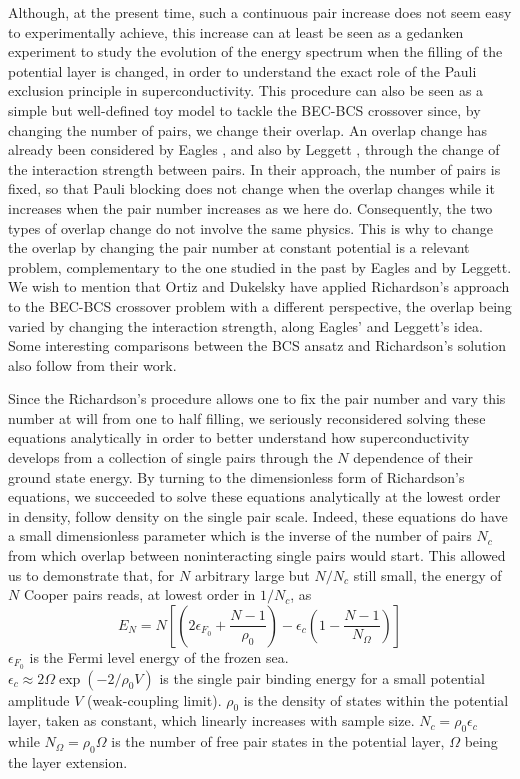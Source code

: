 \documentclass[epj]{svjour}
\begin{document}
Although, at the present time, such a continuous pair increase
does not seem easy to experimentally achieve, this increase can at least be seen as a 
gedanken experiment to study the evolution of the energy spectrum when
the filling of the potential layer is changed, in order to understand the exact role of the Pauli
exclusion principle in superconductivity. 
This procedure can also be
seen as a simple but well-defined toy model to tackle the BEC-BCS crossover
since, by changing the number of pairs, we change their overlap. 
An overlap change has already been considered by Eagles \cite{Eagle}, 
and also by Leggett \cite{LeggettCrossover}, through the change of the interaction strength between pairs. In their approach, the number of pairs is fixed, so that Pauli blocking does not change when the overlap changes while it increases when the pair number increases as we here do. Consequently, the two types of overlap change do not involve the same physics. This is why to change the overlap by changing the pair number at constant potential is a relevant problem, complementary to the one studied in the past by Eagles and by Leggett. We wish to mention that Ortiz and Dukelsky have applied Richardson's approach to the BEC-BCS crossover problem with a different perspective, the overlap being varied by changing the interaction strength\cite{crossoverRich}, along Eagles' and  Leggett's idea.  Some interesting comparisons between the BCS ansatz and Richardson's solution also follow from their work.  


Since the Richardson's procedure allows one to fix the pair number and vary 
this number at will from one to half filling, we seriously reconsidered 
solving these equations analytically in order to better understand how superconductivity develops from a collection of single pairs through the $N$ dependence of their ground state energy. By turning to the dimensionless form of Richardson's equations, we succeeded to solve these equations analytically at the lowest order in density, follow density on the single pair scale\cite{moth}. 
Indeed, these equations do have a small dimensionless parameter which is the inverse of the number of pairs $N_{c}$ from which overlap between noninteracting single pairs would start. 
This allowed us to demonstrate that, for $N$ arbitrary large but $N/N_{c}$ still small, 
the energy of $N$ Cooper pairs reads, at lowest order in $1/ N_{c}$, as
\begin{equation}
E_{N}= N\left[ \left( 2\epsilon _{F_{0}}+\frac{N-1}{\rho _{0}}%
\right)-\epsilon _{c}\left( 1-\frac{N-1}{N_{\Omega }}\right) \right]
\label{eq:eN}
\end{equation}%
$\epsilon _{F_{0}}$ is the Fermi level energy of the frozen sea.  \\$\epsilon _{c}\approx
2\Omega \exp \left( -2/\rho _{0}V\right) $ is the single pair binding
energy for a small potential amplitude $V$ (weak-coupling limit). $\rho
_{0} $ is the density of states within the potential
layer, taken as constant, which linearly increases with sample size. $N_{c }=\rho _{0}\epsilon _{c} $ while $N_{\Omega }=\rho _{0}\Omega $ is the number of free pair states in the potential
layer, $\Omega $ being the layer extension.
\end{document}

